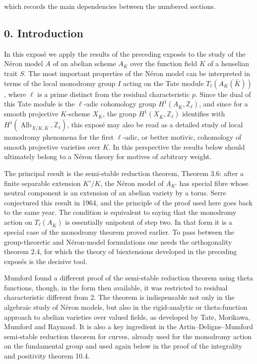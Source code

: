 \documentclass[11pt]{article}
\providecommand{\Z}{\mathbb Z}
\begin{document}
which records the main dependencies between the numbered sections.

\subsection*{0. Introduction}
In this expos\'e we apply the results of the preceding expos\'es to the study of the N\'eron model \(A\) of an abelian scheme \(A_K\) over the function field \(K\) of a henselian trait \(S\).  The most important properties of the N\'eron model can be interpreted in terms of the local monodromy group \(I\) acting on the Tate module \(T_\ell(A_K(\bar K))\), where \(\ell\) is a prime distinct from the residual characteristic \(p\).  Since the dual of this Tate module is the \(\ell\)-adic cohomology group \(H^1(A_{\bar K},\Z_\ell)\), and since for a smooth projective \(K\)-scheme \(X_K\), the group \(H^1(X_{\bar K},\Z_\ell)\) identifies with \(H^1(\operatorname{Alb}_{X/K,\bar K},\Z_\ell)\), this expos\'e may also be read as a detailed study of local monodromy phenomena for the first \(\ell\)-adic, or better motivic, cohomology of smooth projective varieties over \(K\).  In this perspective the results below should ultimately belong to a N\'eron theory for motives of arbitrary weight.

The principal result is the semi-stable reduction theorem, Theorem 3.6: after a finite separable extension \(K'/K\), the N\'eron model of \(A_{K'}\) has special fibre whose neutral component is an extension of an abelian variety by a torus.  Serre conjectured this result in 1964, and the principle of the proof used here goes back to the same year.  The condition is equivalent to saying that the monodromy action on \(T_\ell(A_{\bar K})\) is essentially unipotent of step two.  In that form it is a special case of the monodromy theorem proved earlier.  To pass between the group-theoretic and N\'eron-model formulations one needs the orthogonality theorem 2.4, for which the theory of biextensions developed in the preceding expos\'es is the decisive tool.

Mumford found a different proof of the semi-stable reduction theorem using theta functions, though, in the form then available, it was restricted to residual characteristic different from \(2\).  The theorem is indispensable not only in the algebraic study of N\'eron models, but also in the rigid-analytic or theta-function approach to abelian varieties over valued fields, as developed by Tate, Morikawa, Mumford and Raynaud.  It is also a key ingredient in the Artin--Deligne--Mumford semi-stable reduction theorem for curves, already used for the monodromy action on the fundamental group and used again below in the proof of the integrality and positivity theorem 10.4.
\end{document}
